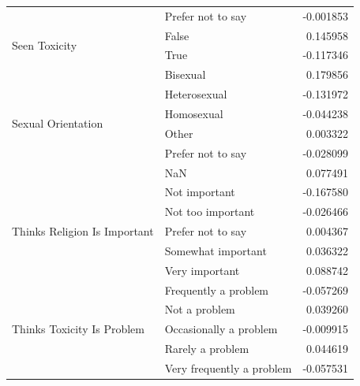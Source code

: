 \begin{table}
\begin{tabular}{llr}
 & Prefer not to say & -0.001853 \\
\cline{1-3}
\multirow[t]{2}{*}{Seen Toxicity} & False & 0.145958 \\
 & True & -0.117346 \\
\cline{1-3}
\multirow[t]{6}{*}{Sexual Orientation} & Bisexual & 0.179856 \\
 & Heterosexual & -0.131972 \\
 & Homosexual & -0.044238 \\
 & Other & 0.003322 \\
 & Prefer not to say & -0.028099 \\
 & NaN & 0.077491 \\
\cline{1-3}
\multirow[t]{5}{*}{Thinks Religion Is Important} & Not important & -0.167580 \\
 & Not too important & -0.026466 \\
 & Prefer not to say & 0.004367 \\
 & Somewhat important & 0.036322 \\
 & Very important & 0.088742 \\
\cline{1-3}
\multirow[t]{5}{*}{Thinks Toxicity Is Problem} & Frequently a problem & -0.057269 \\
 & Not a problem & 0.039260 \\
 & Occasionally a problem & -0.009915 \\
 & Rarely a problem & 0.044619 \\
 & Very frequently a problem & -0.057531 \\
\cline{1-3}
\bottomrule
\end{tabular}
\end{table}
